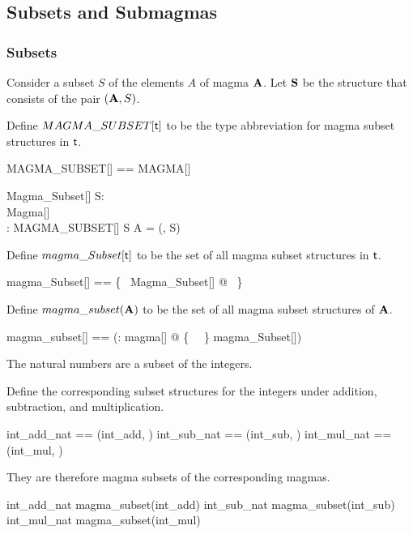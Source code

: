 \documentclass{amsart}
\begin{document}
\subsection{Subsets and Submagmas}

\subsubsection{Subsets}

Consider a subset $S$ of the elements $A$ of magma $\mathbf{A}$.
Let $\mathbf{S}$ be the structure that consists of the pair $(\mathbf{A}, S)$.

Define $MAGMA\_SUBSET[\mathsf{t}]$ to be the type abbreviation for magma subset 
structures in $\mathsf{t}$.

\begin{zed}
	MAGMA\_SUBSET[\genT] == MAGMA[\genT] \cross \power \genT 
\end{zed}

\begin{schema}{Magma\_Subset}[\genT]
	S: \power \genT \\
	Magma[\genT] \\
	\strucS: MAGMA\_SUBSET[\genT]
\where
	S \subseteq A
\also
	\strucS = (\strucA, S)
\end{schema}

Define $magma\_Subset[\mathsf{t}]$ to be the set of all magma subset structures in $\mathsf{t}$.

\begin{zed}
	magma\_Subset[\genT] == \{~ Magma\_Subset[\genT] @ \strucS ~\}
\end{zed}

Define $magma\_subset(\mathbf{A})$ to be the set of all magma subset structures of $\mathbf{A}$.

\begin{zed}
	magma\_subset[\genT] == (\lambda \strucA: magma[\genT] @ \{~ \strucA ~\} \dres magma\_Subset[\genT])
\end{zed}

\begin{example}
The natural numbers are a subset of the integers.

\begin{zed}
	\nat \subset \num
\end{zed}

Define the corresponding subset structures for the integers under addition, subtraction, and multiplication.

\begin{zed}
	int\_add\_nat == (int\_add, \nat)
\also
	int\_sub\_nat == (int\_sub, \nat)
\also
	int\_mul\_nat == (int\_mul, \nat)
\end{zed}

They are therefore magma subsets of the corresponding magmas.

\begin{zed}
	int\_add\_nat \in magma\_subset(int\_add)
\also
	int\_sub\_nat \in magma\_subset(int\_sub)
\also
	int\_mul\_nat \in magma\_subset(int\_mul)
\end{zed}

\end{example}
\end{document}
